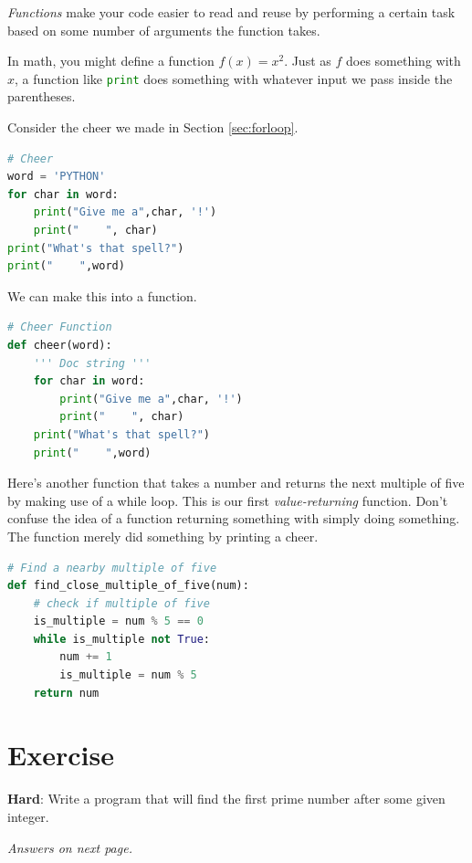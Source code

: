 \emph{Functions} make your code easier to read and reuse by performing a certain task based on some number of arguments
the function takes. 

In math, you might define a function $f(x) = x^2$. Just as $f$ does something with $x$, a function like 
\lstinline[language=Python]{print} does something with whatever input we pass inside the parentheses.

Consider the cheer we made in Section \ref{sec:forloop}. 

\begin{lstlisting}[language = Python]
# Cheer
word = 'PYTHON'
for char in word:
    print("Give me a",char, '!')
    print("    ", char)
print("What's that spell?")
print("    ",word) \end{lstlisting}


We can make this into a function. 


\begin{lstlisting}[language = Python]
# Cheer Function
def cheer(word):
    ''' Doc string '''
    for char in word:
        print("Give me a",char, '!')
        print("    ", char)
    print("What's that spell?")
    print("    ",word) \end{lstlisting}
    
Here's another function that takes a number and returns the next multiple of five by making use of a while loop. This is our first \emph{value-returning} function. Don't confuse the idea of a function returning something with simply doing something. The  function merely did something by printing a cheer. 

\begin{lstlisting}[language = Python]
# Find a nearby multiple of five
def find_close_multiple_of_five(num):
    # check if multiple of five
    is_multiple = num % 5 == 0
    while is_multiple not True:
        num += 1
        is_multiple = num % 5
    return num \end{lstlisting}
    
\section{Exercise}

\textbf{Hard}: Write a program that will find the first prime number after some given integer.

\vfill

\textit{Answers on next page.}

\pagebreak


